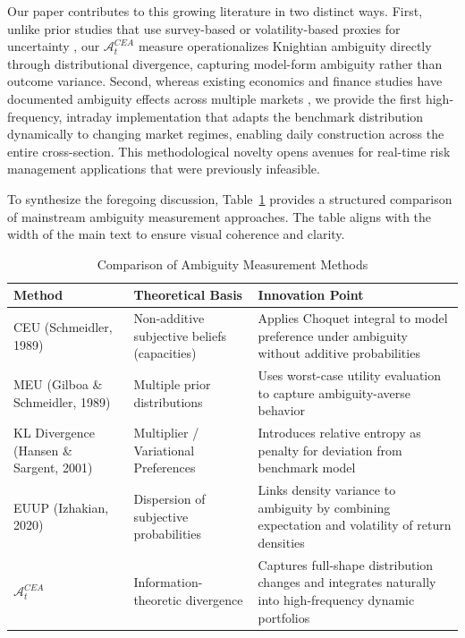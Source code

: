 \documentclass[preprint,12pt,authoryear]{elsarticle}
\renewcommand{\textcolor}[2]{\begingroup\color{#1}#2\endgroup}
\begin{document}
\textcolor{red}{Our paper contributes to this growing literature in two distinct ways. First, unlike prior studies that use survey-based or volatility-based proxies for uncertainty \citep[e.g.][]{xu2016,kim2021}, our $\mathcal{A}^{CEA}_t$ measure operationalizes Knightian ambiguity directly through distributional divergence, capturing model-form ambiguity rather than outcome variance. Second, whereas existing economics and finance studies have documented ambiguity effects across multiple markets \citep[e.g.][]{doi:10.1093/oep/gpae004,doi:10.1007/s10479-021-04314-7,doi:10.1016/j.eneco.2023.107152,doi:10.1016/j.econmod.2021.105524,doi:10.1111/eufm.70003,doi:10.1016/j.irfa.2021.101956}, we provide the first high-frequency, intraday implementation that adapts the benchmark distribution dynamically to changing market regimes, enabling daily construction across the entire cross-section. This methodological novelty opens avenues for real-time risk management applications that were previously infeasible.}

To synthesize the foregoing discussion, Table~\ref{tab:ambiguity_methods} provides a structured comparison of mainstream ambiguity measurement approaches. The table aligns with the width of the main text to ensure visual coherence and clarity.
\begin{table}[H]
  \centering
  \caption{Comparison of Ambiguity Measurement Methods}
  \label{tab:ambiguity_methods}
  \renewcommand{\arraystretch}{1.3}
  \begin{tabularx}{\linewidth}{>{\raggedright\arraybackslash}X >{\raggedright\arraybackslash}X p{}}
    \toprule
    \textbf{Method} & \textbf{Theoretical Basis} & \textbf{Innovation Point} \\
    \midrule
    CEU (Schmeidler, 1989) & Non-additive subjective beliefs (capacities) & Applies Choquet integral to model preference under ambiguity without additive probabilities \\
    MEU (Gilboa \& Schmeidler, 1989) & Multiple prior distributions & Uses worst-case utility evaluation to capture ambiguity-averse behavior \\
    KL Divergence (Hansen \& Sargent, 2001) & Multiplier / Variational Preferences & Introduces relative entropy as penalty for deviation from benchmark model \\
    EUUP (Izhakian, 2020) & Dispersion of subjective probabilities & Links density variance to ambiguity by combining expectation and volatility of return densities \\
    \textbf{$\mathcal{A}^{CEA}_t$} & Information-theoretic divergence & Captures full-shape distribution changes and integrates naturally into high-frequency dynamic portfolios \\
    \bottomrule
  \end{tabularx}
\end{table}
\end{document}
